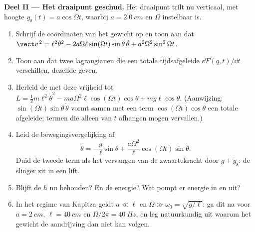 \begin{problem}
\medskip\noindent\textbf{Deel II --- Het draaipunt geschud.}
Het draaipunt trilt nu verticaal, met hoogte $y_{\text{s}}(t) =
a\cos\Omega t$, waarbij $a = \qty{2.0}{cm}$ en $\Omega$ instelbaar is.
\begin{enumerate}[resume]
  \item Schrijf de coördinaten van het gewicht op en toon aan dat
        $\vect v^{\,2} = \ell^2\dot\theta^2 -
        2a\Omega\ell\sin(\Omega t)\sin\theta\,\dot\theta +
        a^2\Omega^2\sin^2\Omega t$.
  \item Toon aan dat twee lagrangianen die een totale tijdsafgeleide
        $\dd F(q,t)/\dd t$ verschillen, dezelfde  geven.
  \item Herleid de  met deze vrijheid tot $L = \tfrac12 m
        \ell^2\dot\theta^2 - ma\Omega^2\ell\cos(\Omega t)\cos\theta +
        mg\ell\cos\theta$. (Aanwijzing: $\sin(\Omega t)\sin\theta\,\dot\theta$
        vormt samen met een term $\cos(\Omega t)\cos\theta$
        een totale afgeleide; termen die alleen van $t$ afhangen mogen
        vervallen.)
  \item Leid de bewegingsvergelijking af
        \[
        \ddot\theta = -\frac{g}{\ell}\sin\theta
         + \frac{a\Omega^2}{\ell}\cos(\Omega t)\sin\theta .
        \]
        Duid de tweede term als het vervangen van de zwaartekracht door
        $g +
        \ddot y_{\text{s}}$: de slinger zit in een lift.
  \item Blijft de  $h$ nu behouden? En de energie? Wat
        pompt er energie in en uit?
  \item In het regime van Kapitza geldt $a \ll \ell$ en $\Omega \gg \omega_0 =
        \sqrt{g/\ell}$: ga dit na voor $a = \qty{2}{cm}$,
        $\ell =
        \qty{40}{cm}$ en $\Omega/2\pi = \qty{40}{Hz}$, en leg
        natuurkundig uit waarom het gewicht de aandrijving dan niet kan
        volgen.
\end{enumerate}


\end{problem}
